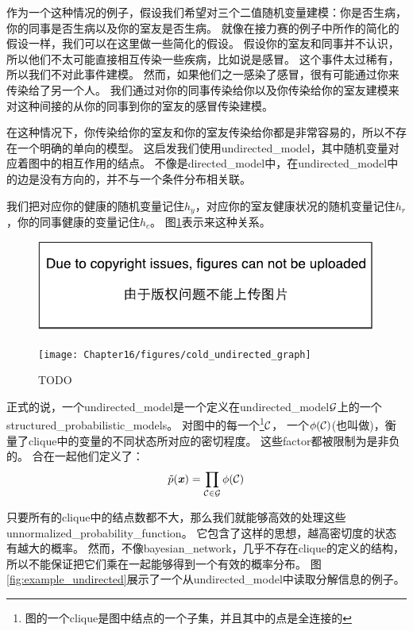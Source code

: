作为一个这种情况的例子，假设我们希望对三个二值随机变量建模：你是否生病，你的同事是否生病以及你的室友是否生病。
就像在接力赛的例子中所作的简化的假设一样，我们可以在这里做一些简化的假设。
假设你的室友和同事并不认识，所以他们不太可能直接相互传染一些疾病，比如说是感冒。
这个事件太过稀有，所以我们不对此事件建模。
然而，如果他们之一感染了感冒，很有可能通过你来传染给了另一个人。
我们通过对你的同事传染给你以及你传染给你的室友建模来对这种间接的从你的同事到你的室友的感冒传染建模。


在这种情况下，你传染给你的室友和你的室友传染给你都是非常容易的，所以不存在一个明确的单向的模型。
这启发我们使用\gls{undirected_model}，其中随机变量对应着图中的相互作用的结点。
不像是\gls{directed_model}中，在\gls{undirected_model}中的边是没有方向的，并不与一个条件分布相关联。


我们把对应你的健康的随机变量记住$h_y$，对应你的室友健康状况的随机变量记住$h_r$，你的同事健康的变量记住$h_c$。
图\ref{fig:cold_undirected_graph}表示来这种关系。

\begin{figure}[!htb]
\ifOpenSource
\centerline{\includegraphics{figure.pdf}}
\else
	\centerline{\texttt{[image: Chapter16/figures/cold\_undirected\_graph]}}	
\fi
	\caption{TODO}
	\label{fig:cold_undirected_graph}
\end{figure}

正式的说，一个\gls{undirected_model}是一个定义在\gls{undirected_model}$\mathcal{G}$上的一个\gls{structured_probabilistic_models}。
对图中的每一个\footnote{图的一个\gls{clique}是图中结点的一个子集，并且其中的点是全连接的}$\mathcal{C}$，
一个$\phi(\mathcal{C})$(也叫做)，衡量了\gls{clique}中的变量的不同状态所对应的密切程度。
这些\gls{factor}都被限制为是非负的。
合在一起他们定义了：
\begin{align}
\label{eqn:163}
\tilde{p}(\boldsymbol{\mathit{x}}) = \prod_{\mathcal{C}\in\mathcal{G}} 
\phi(\mathcal{C})
\end{align}


只要所有的\gls{clique}中的结点数都不大，那么我们就能够高效的处理这些\gls{unnormalized_probability_function}。
它包含了这样的思想，越高密切度的状态有越大的概率。
然而，不像\gls{bayesian_network}，几乎不存在\gls{clique}的定义的结构，所以不能保证把它们乘在一起能够得到一个有效的概率分布。
图\ref{fig:example_undirected}展示了一个从\gls{undirected_model}中读取分解信息的例子。

